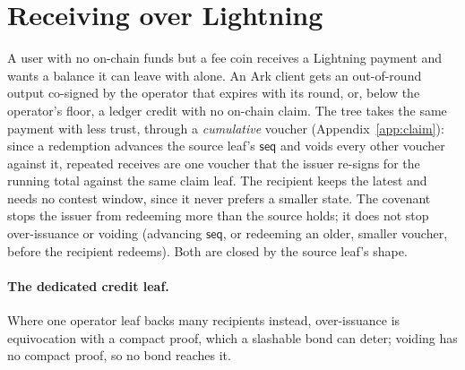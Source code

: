 \section{Receiving over Lightning}\label{sec:receive}

A user with no on-chain funds but a fee coin receives a Lightning payment and wants a
balance it can leave with alone. An Ark client gets an out-of-round
output co-signed by the operator that expires with its round, or, below
the operator's floor, a ledger credit with no on-chain claim. The tree
takes the same payment with less trust, through a \emph{cumulative}
voucher (Appendix~\ref{app:claim}): since a redemption advances the
source leaf's $\mathsf{seq}$ and voids every other voucher against it,
repeated receives are one voucher that the issuer re-signs for the
running total against the same claim leaf. The recipient keeps the
latest and needs no contest window, since it never prefers a smaller
state. The covenant stops the issuer from redeeming more than the source
holds; it does not stop over-issuance or voiding (advancing
$\mathsf{seq}$, or redeeming an older, smaller voucher, before the
recipient redeems). Both are closed by the source leaf's shape.

\paragraph{The dedicated credit leaf.}




Where one operator leaf backs many recipients instead, over-issuance is
equivocation with a compact proof, which a slashable bond can deter;
voiding has no compact proof, so no bond reaches it.

